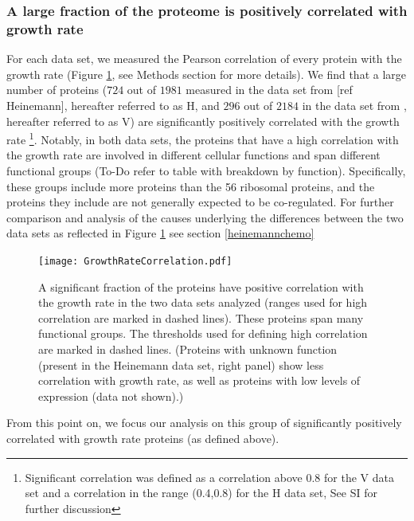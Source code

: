 \documentclass[notitlepage]{article}
\begin{document}
\subsubsection{A large fraction of the proteome is positively correlated with growth rate}
For each data set, we measured the Pearson correlation of every protein with the growth rate (Figure \ref{fig:growthcorr}, see Methods section for more details).
We find that a large number of proteins ($724$ out of $1981$ measured in the data set from [ref Heinemann], hereafter referred to as H, and $296$ out of $2184$ in the data set from \parencite{Valgepea2013}, hereafter referred to as V) are significantly positively correlated with the growth rate \footnote{Significant correlation was defined as a correlation above 0.8 for the V data set and a correlation in the range (0.4,0.8) for the H data set, See SI for further discussion}.
Notably, in both data sets, the proteins that have a high correlation with the growth rate are involved in different cellular functions and span different functional groups (To-Do refer to table with breakdown by function).
Specifically, these groups include more proteins than the 56 ribosomal proteins, and the proteins they include are not generally expected to be co-regulated.
For further comparison and analysis of the causes underlying the differences between the two data sets as reflected in Figure \ref{fig:growthcorr} see section \ref{heinemannchemo}

\begin{figure}[h]
\centering
\texttt{[image: GrowthRateCorrelation.pdf]}
\caption{
A significant fraction of the proteins have positive correlation with the growth rate in the two data sets analyzed (ranges used for high correlation are marked in dashed lines).
These proteins span many functional groups.
The thresholds used for defining high correlation are marked in dashed lines.
(Proteins with unknown function (present in the Heinemann data set, right panel) show less correlation with growth rate, as well as proteins with low levels of expression (data not shown).)
}
\label{fig:growthcorr}
\end{figure}
From this point on, we focus our analysis on this group of significantly positively correlated with growth rate proteins (as defined above).
\end{document}
